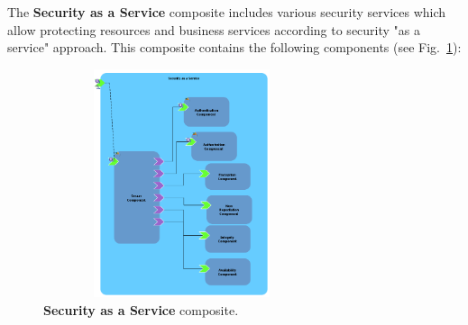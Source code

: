 \documentclass[runningheads,a4paper]{llncs}
\begin{document}
The \textbf{Security as a Service} composite includes various security services which allow protecting resources and business services according to security "as a service" approach. This composite contains the following components (see Fig.~\ref{fig:SecaaS}):
\begin{figure}[ht]  
\centering
\includegraphics[height=190pt, width=230pt]{Secaas1.PNG}
\caption{\textbf{Security as a Service} composite.}
\label{fig:SecaaS}
\end{figure}
\end{document}
